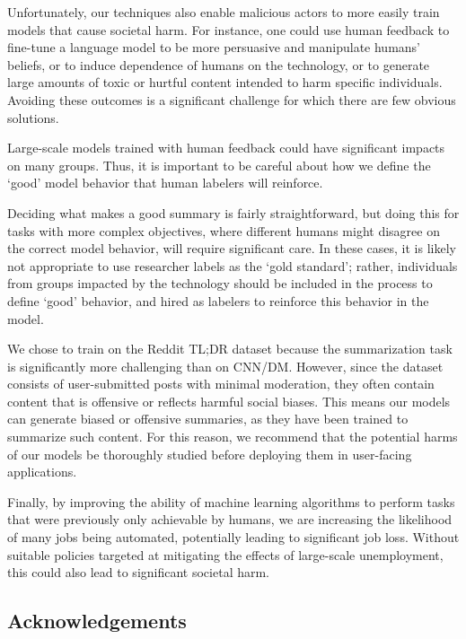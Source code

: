Unfortunately, our techniques also enable malicious actors to more easily train models that cause societal harm. For instance, one could use human feedback to fine-tune a language model to be more persuasive and manipulate humans' beliefs, or to induce dependence of humans on the technology, or to generate large amounts of toxic or hurtful content intended to harm specific individuals. Avoiding these outcomes is a significant challenge for which there are few obvious solutions. 

Large-scale models trained with human feedback could have significant impacts on many groups. Thus, it is important to be careful about how we define the `good' model behavior that human labelers will reinforce.  

Deciding what makes a good summary is fairly straightforward, but doing this for tasks with more complex objectives, where different humans might disagree on the correct model behavior, will require significant care. In these cases, it is likely not appropriate to use researcher labels as the ‘gold standard’; rather, individuals from groups impacted by the technology should be included in the process to define `good' behavior, and hired as labelers to reinforce this behavior in the model.

We chose to train on the Reddit TL;DR dataset because the summarization task is significantly more challenging than on CNN/DM. However, since the dataset consists of user-submitted posts with minimal moderation, they often contain content that is offensive or reflects harmful social biases. This means our models can generate biased or offensive summaries, as they have been trained to summarize such content. For this reason, we recommend that the potential harms of our models be thoroughly studied before deploying them in user-facing applications. 

Finally, by improving the ability of machine learning algorithms to perform tasks that were previously only achievable by humans, we are increasing the likelihood of many jobs being automated, potentially leading to significant job loss. Without suitable policies targeted at mitigating the effects of large-scale unemployment, this could also lead to significant societal harm. 

\subsection*{Acknowledgements}

